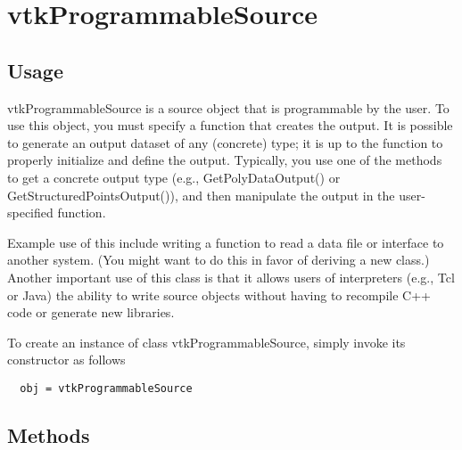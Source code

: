 \section{vtkProgrammableSource}

\subsection{Usage}

 vtkProgrammableSource is a source object that is programmable by the
 user. To use this object, you must specify a function that creates the
 output.  It is possible to generate an output dataset of any (concrete) 
 type; it is up to the function to properly initialize and define the 
 output. Typically, you use one of the methods to get a concrete output 
 type (e.g., GetPolyDataOutput() or GetStructuredPointsOutput()), and 
 then manipulate the output in the user-specified function.

 Example use of this include writing a function to read a data file or
 interface to another system. (You might want to do this in favor of
 deriving a new class.) Another important use of this class is that it
 allows users of interpreters (e.g., Tcl or Java) the ability to write
 source objects without having to recompile C++ code or generate new
 libraries.

To create an instance of class vtkProgrammableSource, simply
invoke its constructor as follows
\begin{verbatim}
  obj = vtkProgrammableSource
\end{verbatim}
\subsection{Methods}

